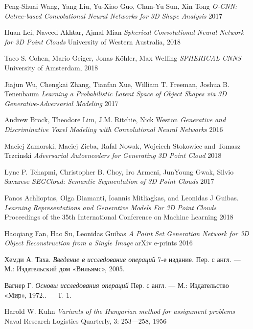 \begin{thebibliography}{00}
 Peng-Shuai Wang, Yang Liu, Yu-Xiao Guo, Chun-Yu Sun, Xin Tong
\emph{O-CNN: Octree-based Convolutional Neural Networks for 3D Shape Analysis} 2017

 Huan Lei, Naveed Akhtar, Ajmal Mian
\emph{Spherical Convolutional Neural Network for 3D Point Clouds} University of Western Australia, 2018

 Taco S. Cohen, Mario Geiger, Jonas Köhler, Max Welling
\emph{SPHERICAL CNNS} University of Amsterdam, 2018

 Jiajun Wu, Chengkai Zhang, Tianfan Xue, William T. Freeman, Joshua B. Tenenbaum
\emph{Learning a Probabilistic Latent Space of Object Shapes via 3D Generative-Adversarial Modeling} 2017

 Andrew Brock, Theodore Lim, J.M. Ritchie, Nick Weston
\emph{Generative and Discriminative Voxel Modeling with Convolutional Neural Networks} 2016

 Maciej Zamorski, Maciej Zieba, Rafal Nowak, Wojciech Stokowiec and Tomasz Trzcinski
\emph{Adversarial Autoencoders for Generating 3D Point Cloud} 2018

 Lyne P. Tchapmi, Christopher B. Choy, Iro Armeni, JunYoung Gwak, Silvio Savarese
\emph{SEGCloud: Semantic Segmentation of 3D Point Clouds} 2017

 Panos Achlioptas, Olga Diamanti, Ioannis Mitliagkas, and Leonidas J Guibas.
\emph{Learning Representations and Generative Models For 3D Point Clouds} Proceedings
of the 35th International Conference on Machine Learning 2018

 Haoqiang Fan, Hao Su, Leonidas Guibas
\emph{A Point Set Generation Network for 3D Object Reconstruction from a Single Image} arXiv e-prints 2016

 Хемди А. Таха.
\emph{Введение в исследование операций} 7-е издание. Пер. с англ. — М.: Издательский дом «Вильямс», 2005.

 Вагнер Г.
\emph{Основы исследования операций} Пер. с англ. — М.: Издательство «Мир», 1972.. — Т. 1.

 Harold W. Kuhn
\emph{Variants of the Hungarian method for assignment problems} Naval Research Logistics Quarterly, 3: 253—258, 1956

\end{thebibliography}